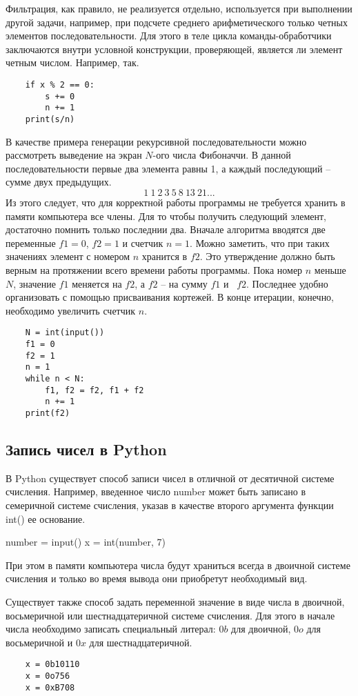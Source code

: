 \documentclass[a4paper, fleqn]{article}
\begin{document}
	Фильтрация, как правило, не реализуется отдельно, используется при выполнении другой задачи, например, при подсчете среднего арифметического только четных элементов последовательности. Для этого в теле цикла команды-обработчики заключаются внутри условной конструкции, проверяющей, является ли элемент четным числом. Например, так.
	\begin{lstlisting}
	if x % 2 == 0:
		s += 0
		n += 1
	print(s/n)
	\end{lstlisting}
	В качестве примера генерации рекурсивной последовательности можно рассмотреть выведение на экран $N$-ого числа Фибоначчи. В данной последовательности первые два элемента равны 1, а каждый последующий -- сумме двух предыдущих. 
	\[1~1~2~3~5~8~13~21 ...\]
	Из этого следует, что для корректной работы программы не требуется хранить в памяти компьютера все члены. Для то чтобы получить следующий элемент, достаточно помнить только последнии два. Вначале алгоритма вводятся две переменные $f1 = 0$, $f2 = 1$ и счетчик $n = 1$. Можно заметить, что при таких значениях элемент с номером $n$ хранится в $f2$. Это утверждение должно быть верным на протяжении всего времени работы программы. Пока номер $n$ меньше $N$, значение $f1$ меняется на $f2$, а $f2$ -- на сумму $f1$ и~ $f2$. Последнее удобно организовать с помощью присваивания кортежей. В конце итерации, конечно, необходимо увеличить счетчик $n$. 
	\begin{lstlisting}
	N = int(input())
	f1 = 0
	f2 = 1
	n = 1
	while n < N:
		f1, f2 = f2, f1 + f2
		n += 1
	print(f2)
	\end{lstlisting}
	
	\subsection*{Запись чисел в Python}
	
	В Python существует способ записи чисел в отличной от десятичной системе счисления. 
	Например, введенное число number может быть записано в семеричной системе счисления, указав в качестве второго аргумента функции int() ее основание.
	
	number = input()
	x = int(number, 7)
	
	При этом в памяти компьютера числа будут храниться всегда в двоичной системе счисления и только во время вывода они приобретут необходимый вид. 
	
	Существует также способ задать переменной значение в виде числа в двоичной, восьмеричной или шестнадцатеричной системе счисления. Для этого в начале числа необходимо записать специальный литерал: $0b$ для двоичной, $0o$ для восьмеричной и $0x$ для шестнадцатеричной. 
	\begin{lstlisting}
	x = 0b10110
 	x = 0o756
	x = 0xB708
	\end{lstlisting}
\end{document}
